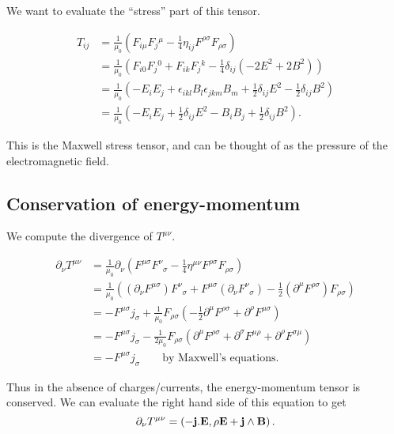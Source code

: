 \documentclass{notes}
\newcommand{\B}{\vect{B}}
\newcommand{\E}{\vect{E}}
\newcommand{\jc}{\vect{j}}
\begin{document}
We want to evaluate the ``stress'' part of this tensor.

\begin{align*}
T_{ij} &= \tfrac{1}{\mu_0} \left( F_{i \mu} F_j{}^\mu - \tfrac{1}{4}
\eta_{ij} F^{\rho \sigma} F_{\rho \sigma}\right) \\
&= \tfrac{1}{\mu_0} \left( F_{i 0} F_j{}^0 + F_{i k} F_j{}^k
- \tfrac{1}{4} \delta_{i j} \left( -2 E^2 + 2 B^2\right) \right) \\
&= \tfrac{1}{\mu_0} \left( -E_i E_j + \epsilon_{i k l} B_l \epsilon_{j k m}
B_m + \tfrac{1}{2} \delta_{i j} E^2 - \tfrac{1}{2} \delta_{i j} B^2 \right)\\
&= \tfrac{1}{\mu_0} \left( -E_i E_j + \tfrac{1}{2} \delta_{i j} E^2
- B_i B_j + \tfrac{1}{2} \delta_{i j} B^2 \right).
\end{align*}

This is the Maxwell stress tensor, and can be thought of as the pressure
of the electromagnetic field.

\subsection{Conservation of energy-momentum}

We compute the divergence of $T^{\mu \nu}$.

\begin{align*}
\partial_\nu T^{\mu \nu} &= \tfrac{1}{\mu_0}
\partial_\nu \left( F^{\mu \sigma} F^\nu{}_\sigma
- \tfrac{1}{4} \eta^{\mu \nu} F^{\rho \sigma} F_{\rho \sigma} \right) \\
&= \tfrac{1}{\mu_0} \left(
\left( \partial_\nu F^{\mu \sigma} \right) F^\nu{}_\sigma
+ F^{\mu\sigma} \left( \partial_\nu F^\nu{}_\sigma \right)
- \tfrac{1}{2} \left(\partial^\mu F^{\rho \sigma} \right) F_{\rho \sigma}
\right) \\
&= -F^{\mu \sigma} j_\sigma  + \tfrac{1}{\mu_0} F_{\rho \sigma} \left(
-\tfrac{1}{2} \partial^\mu F^{\rho \sigma} + \partial^\rho F^{\mu \sigma}
\right) \\
&= -F^{\mu \sigma} j_\sigma  - \tfrac{1}{2 \mu_0} F_{\rho \sigma} \left(
\partial^\mu F^{\rho \sigma} + \partial^\sigma F^{\mu \rho}
+ \partial^\rho F^{\sigma \mu} \right)\\
&= -F^{\mu \sigma} j_\sigma \qquad \text{by Maxwell's equations.}
\end{align*}

Thus in the absence of charges/currents, the energy-momentum tensor is
conserved.  We can evaluate the right hand side of this equation to get
\[
\partial_\nu T^{\mu \nu} = \left( - \jc.\E, \rho \E + \jc \wedge \B \right).
\]
\end{document}
